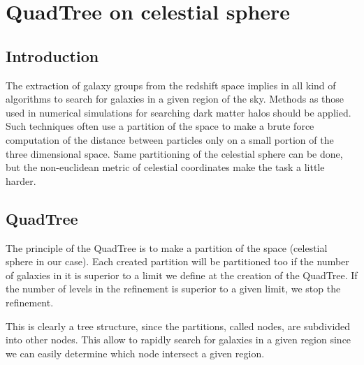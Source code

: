 \chapter{QuadTree on celestial sphere}
\label{cha:quadtree}
%
%
\section{Introduction}
%
The extraction of galaxy groups from the redshift space implies in all kind
of algorithms to search for galaxies in a given region of the sky. Methods
as those used in numerical simulations for searching dark matter halos
should be applied. Such techniques often use a partition of the space to
make a brute force computation of the distance between particles only on a
small portion of the three dimensional space. Same partitioning of the
celestial sphere can be done, but the non-euclidean metric of celestial
coordinates make the task a little harder.
%
\section{QuadTree}
%
The principle of the QuadTree is to make a partition of the space (celestial
sphere in our case). Each created partition will be partitioned too if the
number of galaxies in it is superior to a limit we define at the creation of
the QuadTree. If the number of levels in the refinement is superior to a
given limit, we stop the refinement.

This is clearly a tree structure, since the partitions, called nodes, are
subdivided into other nodes. This allow to rapidly search for galaxies in a
given region since we can easily determine which node intersect a given
region.
%
